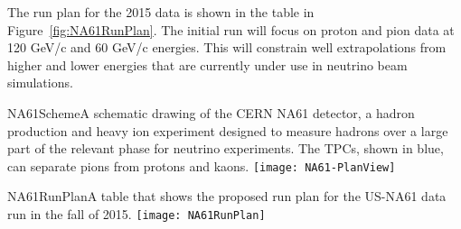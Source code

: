The run plan for the 2015 data is shown in the table in Figure~\ref{fig:NA61RunPlan}. The initial run will focus on proton and pion data at 120 GeV/c and 60 GeV/c energies. This will constrain well extrapolations from higher and lower energies that are currently under use in neutrino beam simulations.

\begin{cdrfigure}{NA61Scheme}{A schematic drawing of the CERN NA61 detector, a hadron production and heavy ion experiment designed to measure hadrons over a large part of the relevant phase for neutrino experiments. The TPCs, shown in blue, can separate pions from protons and kaons.}
\texttt{[image: NA61-PlanView]}
\end{cdrfigure}

\begin{cdrfigure}{NA61RunPlan}{A table that shows the proposed run plan for 
the US-NA61 data run in the fall of 2015.}
\texttt{[image: NA61RunPlan]}

\end{cdrfigure}

